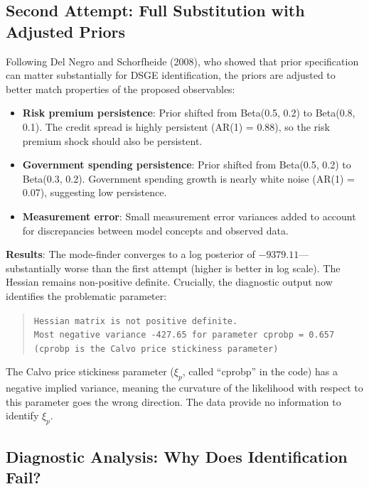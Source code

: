 \documentclass[12pt]{article}
\begin{document}
\subsection{Second Attempt: Full Substitution with Adjusted Priors}

Following Del Negro and Schorfheide (2008), who showed that prior specification can matter substantially for DSGE identification, the priors are adjusted to better match properties of the proposed observables:

\begin{itemize}
    \item \textbf{Risk premium persistence}: Prior shifted from Beta(0.5, 0.2) to Beta(0.8, 0.1). The credit spread is highly persistent (AR(1) = 0.88), so the risk premium shock should also be persistent.
    
    \item \textbf{Government spending persistence}: Prior shifted from Beta(0.5, 0.2) to Beta(0.3, 0.2). Government spending growth is nearly white noise (AR(1) = 0.07), suggesting low persistence.
    
    \item \textbf{Measurement error}: Small measurement error variances added to account for discrepancies between model concepts and observed data.
\end{itemize}

\textbf{Results}: The mode-finder converges to a log posterior of $-9379.11$---substantially worse than the first attempt (higher is better in log scale). The Hessian remains non-positive definite. Crucially, the diagnostic output now identifies the problematic parameter:

\begin{quote}
\texttt{Hessian matrix is not positive definite.}\\
\texttt{Most negative variance -427.65 for parameter cprobp = 0.657}\\
\texttt{(cprobp is the Calvo price stickiness parameter)}
\end{quote}

The Calvo price stickiness parameter ($\xi_p$, called ``cprobp'' in the code) has a negative implied variance, meaning the curvature of the likelihood with respect to this parameter goes the wrong direction. The data provide no information to identify $\xi_p$.

\subsection{Diagnostic Analysis: Why Does Identification Fail?}
\end{document}
